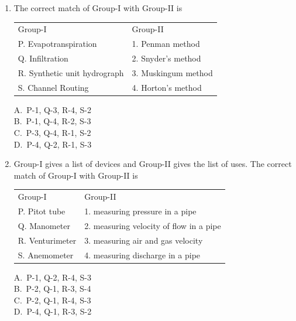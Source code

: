 \documentclass[journal,12pt,onecolumn]{IEEEtran}
\theoremstyle{remark}
\begin{document}
\begin{enumerate}
\noindent\item The correct match of Group-I with Group-II is
\hfill{}
\begin{table}[H]
\centering
\begin{tabular}{l l}
Group-I & Group-II \\
P. Evapotranspiration     & 1. Penman method \\
Q. Infiltration    & 2. Snyder’s method \\
R. Synthetic unit hydrograph    & 3. Muskingum method  \\
S. Channel Routing    & 4. Horton's method
\end{tabular}
\label{table1}
\end{table}

\begin{multicols}{4}
A.\ P-1, Q-3, R-4, S-2 \\
B.\ P-1, Q-4, R-2, S-3 \\
C.\ P-3, Q-4, R-1, S-2 \\
D.\ P-4, Q-2, R-1, S-3
\end{multicols}

\noindent\item Group-I gives a list of devices and Group-II gives the list of uses. The correct match of Group-I with Group-II is
\hfill{}

\begin{table}[H]
    \centering
\begin{tabular}{l l}
Group-I  & Group-II  \\
P. Pitot tube & 1. measuring pressure in a pipe \\
Q. Manometer   & 2. measuring velocity of flow in a pipe     \\
R. Venturimeter     & 3. measuring air and gas velocity          \\
S. Anemometer    & 4. measuring discharge in a pipe
\end{tabular}
\label{table2}
\end{table}

\begin{multicols}{4}
A.\ P-1, Q-2, R-4, S-3 \\
B.\ P-2, Q-1, R-3, S-4 \\
C.\ P-2, Q-1, R-4, S-3 \\
D.\ P-4, Q-1, R-3, S-2
\end{multicols}


\end{enumerate}
\end{document}
